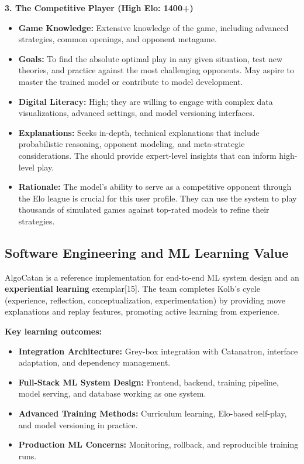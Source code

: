 \documentclass{article}
\begin{document}
\noindent\textbf{3. The Competitive Player (High Elo: 1400+)}
\begin{itemize}
    \item \textbf{Game Knowledge:} Extensive knowledge of the game, including advanced strategies, common openings, and opponent metagame.
    \item \textbf{Goals:} To find the absolute optimal play in any given situation, test new theories, and practice against the most challenging opponents. May aspire to master the trained model or contribute to model development.
    \item \textbf{Digital Literacy:} High; they are willing to engage with complex data visualizations, advanced settings, and model versioning interfaces.
    \item \textbf{\LLM{} Explanations:} Seeks in-depth, technical explanations that include probabilistic reasoning, opponent modeling, and meta-strategic considerations. The \LLM{} should provide expert-level insights that can inform high-level play.
    \item \textbf{Rationale:} The \AI{} model's ability to serve as a competitive opponent through the Elo league is crucial for this user profile. They can use the system to play thousands of simulated games against top-rated models to refine their strategies.
\end{itemize}

\subsection{Software Engineering and ML Learning Value}\label{subsec:se-ml-learning}
AlgoCatan is a reference implementation for end-to-end ML system design and an \textbf{experiential learning} exemplar[15].
The team completes Kolb’s cycle (experience, reflection, conceptualization, experimentation) by providing move
explanations and replay features, promoting active learning from experience.

\hspace{1cm}

\noindent\textbf{Key learning outcomes:}
\begin{itemize}
    \item \textbf{Integration Architecture:} Grey-box integration with Catanatron, interface adaptation, and dependency management.
    \item \textbf{Full-Stack ML System Design:} Frontend, backend, training pipeline, model serving, and database working as one system.
    \item \textbf{Advanced Training Methods:} Curriculum learning, Elo-based self-play, and model versioning in practice.
    \item \textbf{Production ML Concerns:} Monitoring, rollback, and reproducible training runs.
\end{itemize}
\end{document}
